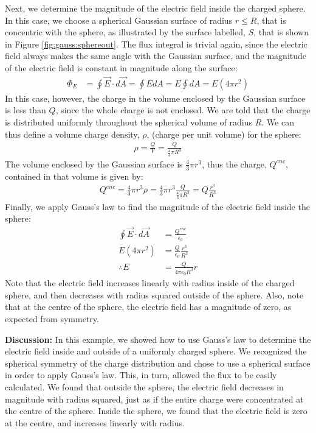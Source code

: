 \begin{example}
Next, we determine the magnitude of the electric field inside the charged sphere. In this case, we choose a spherical Gaussian surface of radius $r\leq R$, that is concentric with the sphere, as illustrated by the surface labelled, $S$, that is shown in Figure \ref{fig:gauss:sphereout}.
The flux integral is trivial again, since the electric field always makes the same angle with the Gaussian surface, and the magnitude of the electric field is constant in magnitude along the surface:
\begin{align*}
\Phi_E&=\oint \vec E\cdot d\vec A=\oint E dA= E\oint dA=E(4\pi r^2)
\end{align*}
In this case, however, the charge in the volume enclosed by the Gaussian surface is less than $Q$, since the whole charge is not enclosed. We are told that the charge is distributed uniformly throughout the spherical volume of radius $R$. We can thus define a volume charge density, $\rho$, (charge per unit volume) for the sphere:
\begin{align*}
\rho=\frac{Q}{V}=\frac{Q}{\frac{4}{3}\pi R^3}
\end{align*}
The volume enclosed by the Gaussian surface is $\frac{4}{3}\pi r^3$, thus the charge, $Q^{enc}$, contained in that volume is given by:
\begin{align*}
Q^{enc}=\frac{4}{3}\pi r^3 \rho=\frac{4}{3}\pi r^3 \frac{Q}{\frac{4}{3}\pi R^3}=Q\frac{r^3}{R^3}
\end{align*}
Finally, we apply Gauss's law to find the magnitude of the electric field inside the sphere:
\begin{align*}
\oint \vec E\cdot d\vec A&=\frac{Q^{enc}}{\epsilon_0} \\
E(4\pi r^2) &=\frac{Q}{\epsilon_0}\frac{r^3}{R^3}\\
\therefore E&= \frac{Q}{4\pi\epsilon_0R^3}r
\end{align*}
Note that the electric field increases linearly with radius inside of the charged sphere, and then decreases with radius squared outside of the sphere. Also, note that at the centre of the sphere, the electric field has a magnitude of zero, as expected from symmetry.

\textbf{Discussion: } In this example, we showed how to use Gauss's law to determine the electric field inside and outside of a uniformly charged sphere. We recognized the spherical symmetry of the charge distribution and chose to use a spherical surface in order to apply Gauss's law.  This, in turn, allowed the flux to be easily calculated. We found that outside the sphere, the electric field decreases in magnitude with radius squared, just as if the entire charge were concentrated at the centre of the sphere. Inside the sphere, we found that the electric field is zero at the centre, and increases linearly with radius. 
\end{example}

